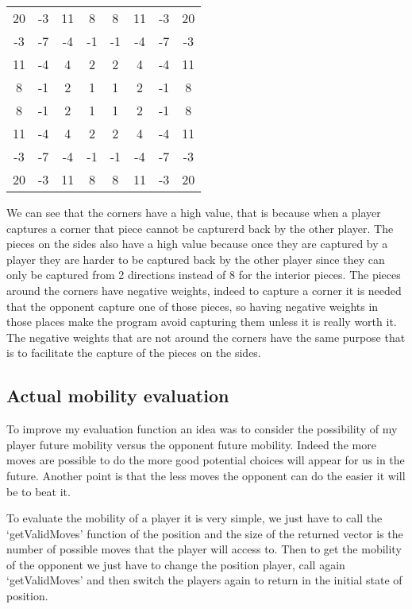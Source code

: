 \begin{center}
    \begin{tabular}{ c c c c c c c c } 
        20 & -3 & 11 & 8 & 8 & 11 & -3 & 20\\ 
        -3 & -7 & -4 & -1 & -1 & -4 & -7 & -3\\ 
        11 & -4 & 4 & 2 & 2 & 4 & -4 & 11\\ 
        8 & -1 & 2 & 1 & 1 & 2 & -1 & 8\\ 
        8 & -1 & 2 & 1 & 1 & 2 & -1 & 8\\ 
        11 & -4 & 4 & 2 & 2 & 4 & -4 & 11\\ 
        -3 & -7 & -4 & -1 & -1 & -4 & -7 & -3\\ 
        20 & -3 & 11 & 8 & 8 & 11 & -3 & 20\\ 
    \end{tabular}
\end{center}

We can see that the corners have a high value, that is because when a player captures a corner that piece cannot be capturerd back by the other player.
The pieces on the sides also have a high value because once they are captured by a player they are harder to be captured back by the other player since they can only be captured from 2 directions instead of 8 for the interior pieces.
The pieces around the corners have negative weights, indeed to capture a corner it is needed that the opponent capture one of those pieces, so having negative weights in those places make the program avoid capturing them unless it is really worth it.
The negative weights that are not around the corners have the same purpose that is to facilitate the capture of the pieces on the sides.

\subsection{Actual mobility evaluation}

To improve my evaluation function an idea was to consider the possibility of my player future mobility versus the opponent future mobility.
Indeed the more moves are possible to do the more good potential choices will appear for us in the future.
Another point is that the less moves the opponent can do the easier it will be to beat it.

To evaluate the mobility of a player it is very simple, we just have to call the `getValidMoves' function of the position and the size of the returned vector is the number of possible moves that the player will access to.
Then to get the mobility of the opponent we just have to change the position player, call again `getValidMoves' and then switch the players again to return in the initial state of position.

